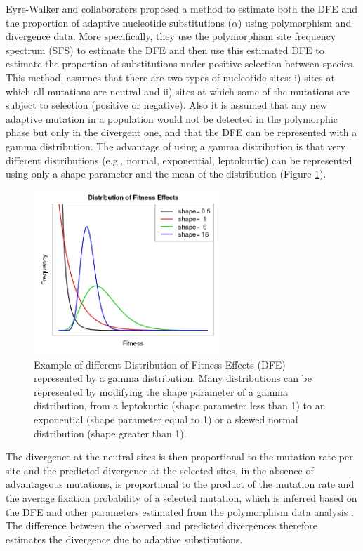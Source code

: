 Eyre-Walker and collaborators 
	\citep{Eyre-Walker2009}
proposed a method to estimate both the DFE and the proportion of adaptive nucleotide substitutions ($\alpha$)
using polymorphism and divergence data.
More specifically, they use the polymorphism site frequency spectrum (SFS) 
to estimate the DFE and then use this estimated DFE to estimate the proportion of substitutions under positive selection between species.
This method, assumes that there are two types of nucleotide sites: 
i) sites at which all mutations are neutral and ii) sites at which some of the mutations are subject to selection (positive or negative).
Also it is assumed that any new adaptive mutation in a population would not be detected in the polymorphic phase but only in the divergent one, 
and that the DFE can be represented with a gamma distribution.
The advantage of using a gamma distribution is that very different distributions (e.g., normal, exponential, leptokurtic) can be represented using only a shape parameter and the mean of the distribution (Figure \ref{fig:Gamma}).

\begin{figure}[h]
  \includegraphics[width=7cm]{./Images/Gamma_dist.jpeg}
  \centering
  \caption{Example of different Distribution of Fitness Effects (DFE) represented by a gamma distribution.
  Many distributions can be represented by modifying the shape parameter of a gamma distribution, from
  a leptokurtic (shape parameter less than 1) to an exponential (shape parameter equal to 1) or a
  skewed normal distribution (shape  greater than 1).
   }
  \label{fig:Gamma}
\end{figure}


The divergence at the neutral sites is then proportional to the mutation rate per site and the predicted divergence at the selected sites, in the absence of advantageous mutations, 
is proportional to the product of the mutation rate and the average fixation probability of a selected mutation, 
which is inferred based on the DFE and other parameters estimated from the polymorphism data analysis
	\citep{Eyre-Walker2009}.
The difference between the observed and predicted divergences therefore estimates the divergence due to adaptive substitutions.

